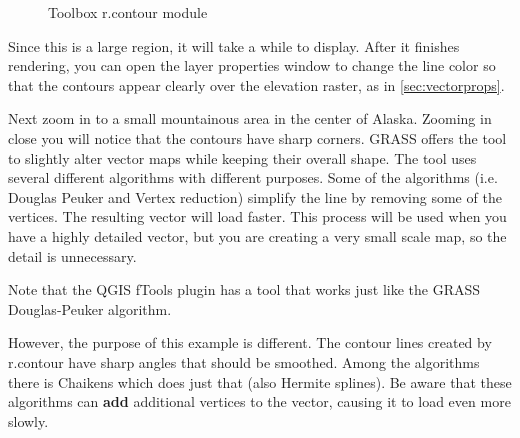 \begin{figure}[ht]
\centering
    \hspace{0.5cm}
   \caption{\grass Toolbox r.contour module \nixcaption}\label{fig:grass_toolbox_rcontour}
\end{figure}

Since this is a large region, it will take a while to display. After it
finishes rendering, you can open the layer properties window to change the
line color so that the contours appear clearly over the elevation raster, as
in \ref{sec:vectorprops}.

Next zoom in to a small mountainous area in the center of Alaska.
Zooming in close you will notice that the contours have sharp corners. GRASS
offers the  tool to slightly alter vector maps while
keeping their overall shape. The tool uses several different algorithms with
different purposes. Some of the algorithms (i.e. Douglas Peuker and Vertex
reduction) simplify the line by removing some of the vertices. The resulting
vector will load faster. This process will be used when you have a highly
detailed vector, but you are creating a very small scale map, so the detail
is unnecessary. 

\begin{Tip}\caption{\textsc{The simplify tool}}
Note that the QGIS fTools plugin has a  tool that works just like the GRASS 
Douglas-Peuker algorithm. 
\end{Tip}  

However, the purpose of this example is different. The contour lines created
by r.contour have sharp angles that should be smoothed. Among the
 algorithms there is Chaikens which does just that
(also Hermite splines). Be aware that these algorithms can \textbf{add}
additional vertices to the vector, causing it to load even more slowly.

